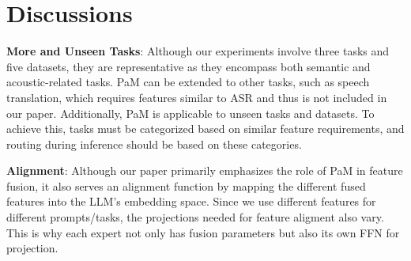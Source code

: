 \section{Discussions}

\textbf{More and Unseen Tasks}: Although our experiments involve three tasks and five datasets, they are representative as they encompass both semantic and acoustic-related tasks. PaM can be extended to other tasks, such as speech translation, which requires features similar to ASR and thus is not included in our paper. Additionally, PaM is applicable to unseen tasks and datasets. To achieve this, tasks must be categorized based on similar feature requirements, and routing during inference should be based on these categories.

\noindent \textbf{Alignment}: Although our paper primarily emphasizes the role of PaM in feature fusion, it also serves an alignment function by mapping the different fused features into the LLM's embedding space. Since we use different features for different prompts/tasks, the projections needed for feature aligment also vary. This is why each expert not only has fusion parameters but also its own FFN for projection.
